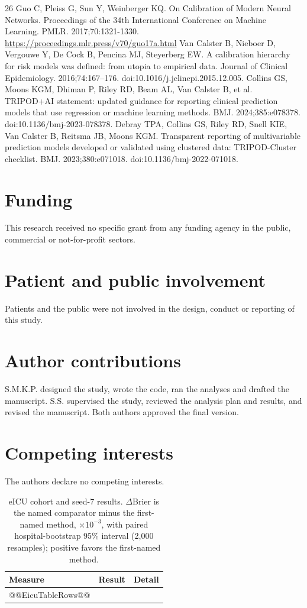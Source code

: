 \documentclass[11pt]{article}
\begin{document}
\begin{thebibliography}{26}
 Guo C, Pleiss G, Sun Y, Weinberger KQ. On Calibration of Modern Neural Networks. Proceedings of the 34th International Conference on Machine Learning. PMLR. 2017;70:1321-1330. \url{https://proceedings.mlr.press/v70/guo17a.html}
 Van Calster B, Nieboer D, Vergouwe Y, De Cock B, Pencina MJ, Steyerberg EW. A calibration hierarchy for risk models was defined: from utopia to empirical data. Journal of Clinical Epidemiology. 2016;74:167--176. doi:10.1016/j.jclinepi.2015.12.005.
 Collins GS, Moons KGM, Dhiman P, Riley RD, Beam AL, Van Calster B, et al. TRIPOD+AI statement: updated guidance for reporting clinical prediction models that use regression or machine learning methods. BMJ. 2024;385:e078378. doi:10.1136/bmj-2023-078378.
 Debray TPA, Collins GS, Riley RD, Snell KIE, Van Calster B, Reitsma JB, Moons KGM. Transparent reporting of multivariable prediction models developed or validated using clustered data: TRIPOD-Cluster checklist. BMJ. 2023;380:e071018. doi:10.1136/bmj-2022-071018.
\end{thebibliography}

\section*{Funding}
This research received no specific grant from any funding agency in the public, commercial or not-for-profit sectors.

\section*{Patient and public involvement}
Patients and the public were not involved in the design, conduct or reporting of this study.

\section*{Author contributions}
S.M.K.P. designed the study, wrote the code, ran the analyses and drafted the manuscript. S.S. supervised the study, reviewed the analysis plan and results, and revised the manuscript. Both authors approved the final version.

\section*{Competing interests}
The authors declare no competing interests.

\clearpage
\begin{table}[p]
\caption{eICU cohort and seed-7 results. $\Delta$Brier is the named comparator minus the first-named method, $\times10^{-3}$, with paired hospital-bootstrap 95\% interval (2,000 resamples); positive favors the first-named method.}
\label{tab:eicu}
\centering\footnotesize
\begin{tabularx}{\textwidth}{@{}p{}p{}X@{}}
\toprule
Measure & Result & Detail \\
\midrule
@@EicuTableRows@@
\bottomrule
\end{tabularx}
\end{table}
\end{document}
